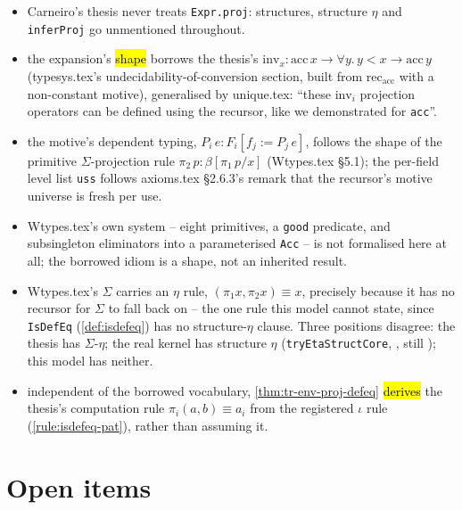 \begin{itemize}
\item {} Carneiro's thesis never treats \texttt{Expr.proj}: structures, structure
$\eta$ and \texttt{inferProj} go unmentioned throughout.
\item {} the expansion's \hl{shape} borrows the thesis's
$\mathrm{inv}_x:\mathrm{acc}\,x\to\forall y.\,y<x\to\mathrm{acc}\,y$ (typesys.tex's
undecidability-of-conversion section, built from $\mathrm{rec}_{\mathrm{acc}}$ with a non-constant
motive), generalised by unique.tex: ``these $\mathrm{inv}_i$ projection operators can be defined
using the recursor, like we demonstrated for \texttt{acc}''.
\item {} the motive's dependent typing, $P_i\,e : F_i[f_j := P_j\,e]$, follows the shape
of the primitive $\Sigma$-projection rule $\pi_2\,p : \beta[\pi_1\,p/x]$ (Wtypes.tex \S5.1); the
per-field level list \texttt{uss} follows axioms.tex \S2.6.3's remark that the recursor's motive
universe is fresh per use.
\item {} Wtypes.tex's own system -- eight primitives, a \texttt{good} predicate, and
subsingleton eliminators into a parameterised \texttt{Acc} -- is not formalised here at all; the
borrowed idiom is a shape, not an inherited result.
\item {} Wtypes.tex's $\Sigma$ carries an $\eta$ rule, $(\pi_1 x,\pi_2 x)\equiv x$,
precisely because it has no recursor for $\Sigma$ to fall back on -- the one rule this model cannot
state, since \texttt{IsDefEq} (\ref{def:isdefeq}) has no structure-$\eta$ clause. Three positions
disagree: the thesis has $\Sigma$-$\eta$; the real kernel has structure $\eta$
(\texttt{tryEtaStructCore}, , still
\stSorry{}); this model has neither.
\item {} independent of the borrowed vocabulary, \ref{thm:tr-env-proj-defeq}
\hl{derives} the thesis's computation rule $\pi_i(a,b)\equiv a_i$ from the registered $\iota$ rule
(\ref{rule:isdefeq-pat}), rather than assuming it.
\end{itemize}

\section{Open items}
\label{sec:contrib-trproj-consumers}


